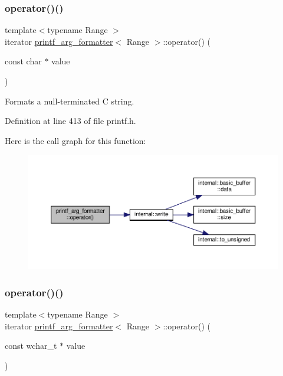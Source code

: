 \subsubsection{\texorpdfstring{operator()()}{operator()()}\hspace{0.1cm}{\footnotesize\ttfamily [3/8]}}
{\footnotesize\ttfamily template$<$typename Range $>$ \\
iterator \hyperlink{classprintf__arg__formatter}{printf\+\_\+arg\+\_\+formatter}$<$ Range $>$\+::operator() (\begin{DoxyParamCaption}\item[{const char $\ast$}]{value }\end{DoxyParamCaption})\hspace{0.3cm}{\ttfamily [inline]}}

Formats a null-\/terminated C string. 

Definition at line 413 of file printf.\+h.

Here is the call graph for this function\+:
\nopagebreak
\begin{figure}[H]
\begin{center}
\leavevmode
\includegraphics[width=350pt]{classprintf__arg__formatter_a4e462c5b70ceef75a41261472aa56313_cgraph}
\end{center}
\end{figure}
\mbox{\label{classprintf__arg__formatter_a880170cd3e3ace7546cb01268586ac77}} 
\subsubsection{\texorpdfstring{operator()()}{operator()()}\hspace{0.1cm}{\footnotesize\ttfamily [4/8]}}
{\footnotesize\ttfamily template$<$typename Range $>$ \\
iterator \hyperlink{classprintf__arg__formatter}{printf\+\_\+arg\+\_\+formatter}$<$ Range $>$\+::operator() (\begin{DoxyParamCaption}\item[{const wchar\+\_\+t $\ast$}]{value }\end{DoxyParamCaption})\hspace{0.3cm}{\ttfamily [inline]}}

